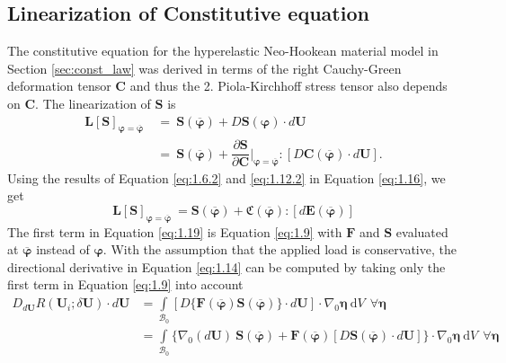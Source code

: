 \documentclass[11pt,a4paper,final]{article}
\begin{document}
\subsection{\textbf{Linearization of Constitutive equation}}
The constitutive equation for the hyperelastic Neo-Hookean material model in Section \eqref{sec:const_law} was derived in terms of the right Cauchy-Green deformation tensor $\mathbf{C}$ and thus the 2. Piola-Kirchhoff stress tensor also depends on $\mathbf{C}$. The linearization of $\mathbf{S}$ is
\begin{align}
\mathbf{L}\left[ \mathbf{S} \right]_{\bm{\varphi} = \overline{\bm{\varphi}}} \ &= \ \mathbf{S}(\overline{\bm{\varphi}}) + D \mathbf{S}(\bm{\varphi}) \cdot d\mathbf{U} \nonumber \\
&= \ \mathbf{S}(\overline{\bm{\varphi}}) + \dfrac{\partial \mathbf{S}}{\partial \mathbf{C}} \Big|_{\bm{\varphi} = \overline{\bm{\varphi}}} : \left[ D \mathbf{C}(\overline{\bm{\varphi}}) \cdot d\mathbf{U} \right].
\label{eq:1.16}
\end{align}
Using the results of Equation \eqref{eq:1.6.2} and \eqref{eq:1.12.2} in Equation \eqref{eq:1.16}, we get
\begin{equation}
\mathbf{L}\left[ \mathbf{S} \right]_{\bm{\varphi} = \overline{\bm{\varphi}}} \ = \mathbf{S}(\overline{\bm{\varphi}}) + \mathfrak{C}(\overline{\bm{\varphi}}) : \left[ d \mathbf{E}(\overline{\bm{\varphi}}) \right]
\label{eq:1.19}
\end{equation} \newline 
The first term in Equation \eqref{eq:1.19} is Equation \eqref{eq:1.9} with $\mathbf{F}$ and $\mathbf{S}$ evaluated at $\overline{\bm{\varphi}}$ instead of $\bm{\varphi}$. With the assumption that the applied load is conservative, the directional derivative in Equation \eqref{eq:1.14} can be computed by taking only the first term in Equation \eqref{eq:1.9} into account
\begin{align}
D_{d\mathbf{U}} R(\mathbf{U}_i; \delta \mathbf{U}) \cdot d\mathbf{U} &= \int\limits_{\mathcal{B}_0} \left[ D \{ \mathbf{F}(\overline{\bm{\varphi}}) \mathbf{S}(\overline{\bm{\varphi}})\} \cdot d\mathbf{U} \right] \cdot \nabla_0 \bm{\eta} \ \mathrm{d}V \ \ \forall \bm{\eta} \nonumber \\
&= \int\limits_{\mathcal{B}_0} \Big\lbrace \nabla_0 (d\mathbf{U}) \ \mathbf{S}(\overline{\bm{\varphi}}) + \mathbf{F}(\overline{\bm{\varphi}}) \left[ D \mathbf{S}(\overline{\bm{\varphi}}) \cdot d\mathbf{U} \right] \Big\rbrace \cdot \nabla_0 \bm{\eta} \ \mathrm{d}V \ \ \forall \bm{\eta}
\label{eq:1.20}
\end{align}
\end{document}
